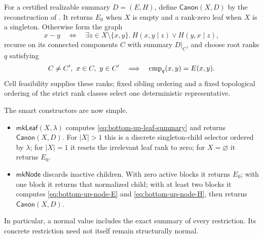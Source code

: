 For a certified realizable summary \(D=(E,H)\), define
\(\mathsf{Canon}(X,D)\) by the reconstruction of
.  It returns \(E_0\) when \(X\) is empty
and a rank-zero leaf when \(X\) is a singleton.  Otherwise form the graph
\begin{equation}
 x-y
 \quad\Longleftrightarrow\quad
 \exists z\in X\setminus\{x,y\}.\
 H(x,y\mid z)\lor H(y,x\mid z),
 \label{eq:bottom-up-component-graph}
\end{equation}
recurse on its connected components \(C\) with summary \(D|_C\), and choose
root ranks \(q\) satisfying
\begin{equation}
 C\ne C',\ x\in C,\ y\in C'
 \quad\Longrightarrow\quad
 \operatorname{cmp}_q(x,y)=E(x,y).
 \label{eq:bottom-up-rank-realization}
\end{equation}
Cell feasibility  supplies these ranks;
fixed sibling ordering and a fixed topological ordering of the strict rank
classes select one deterministic representative.

The smart constructors are now simple.

\begin{itemize}
\item \(\mathsf{mkLeaf}(X,\lambda)\) computes
      \autoref{eq:bottom-up-leaf-summary} and returns
      \(\mathsf{Canon}(X,D)\).  For \(|X|>1\) this is a discrete
      singleton-child selector ordered by \(\lambda\); for \(|X|=1\) it
      resets the irrelevant leaf rank to zero; for \(X=\varnothing\) it
      returns \(E_0\).
\item \(\mathsf{mkNode}\) discards inactive children.  With zero active
      blocks it returns \(E_0\); with one block it returns that normalized
      child; with at least two blocks it computes
      \autoref{eq:bottom-up-node-E} and \autoref{eq:bottom-up-node-H}, then returns
      \(\mathsf{Canon}(X,D)\).
\end{itemize}

In particular, a normal value includes the exact summary of every
restriction.  Its concrete restriction need not itself remain structurally
normal.

